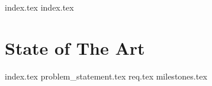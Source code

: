 {index.tex}
{index.tex}
\chapter{State of The Art}\label{cha:sota}
{index.tex}
{problem_statement.tex}
{req.tex}
{milestones.tex}
